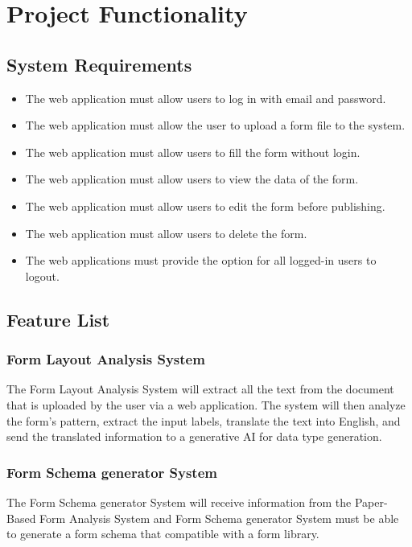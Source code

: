 \documentclass[12pt,oneside,openright,a4paper]{cpe-english-project}
\begin{document}
\section{Project Functionality}

\subsection{System Requirements}

\begin{itemize}
 \item The web application must allow users to log in with email and password. 
 \item The web application must allow the user to upload a form file to the system.
 \item The web application must allow users to fill the form without login.
 \item The web application must allow users to view the data of the form.
 \item The web application must allow users to edit the form before publishing.
 \item The web application must allow users to delete the form.
 \item The web applications must provide the option for all logged-in users to logout.
\end{itemize}

\subsection{Feature List}

\subsubsection{Form Layout Analysis System}

The Form Layout Analysis System will extract all the text from the document that is uploaded by the user via a web application. The system will then analyze the form’s pattern, extract the input labels, translate the text into English, and send the translated information to a generative AI for data type generation.

\subsubsection{Form Schema generator System}

The Form Schema generator System will receive information from the Paper-Based Form Analysis System and Form Schema generator System must be able to generate a form schema that compatible with a form library.
\end{document}
